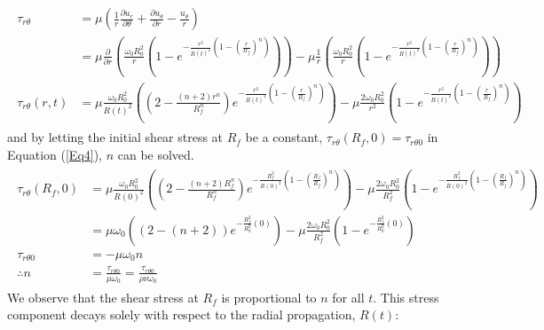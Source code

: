 \documentclass{article}
\begin{document}
\begin{align}\label{Eq4}
    \begin{split}
        \tau_{r \theta} &=  \mu \left (\frac{1}{r} \frac{\partial u_r}{\partial \theta}+  \frac{\partial u_\theta }{\partial r} - \frac{u_\theta}{r}\right ) \\
        &= \mu\frac{\partial}{\partial r}\left(\frac{\omega_{0}R_{0}^{2}}{r}\left(1-e^{-\frac{r^{2}}{R\left(t\right)^{2}}\left(1-\left(\frac{r}{R_{f}}\right)^{n}\right)}\right)\right)-\mu\frac{1}{r}\left(\frac{\omega_{0}R_{0}^{2}}{r}\left(1-e^{-\frac{r^{2}}{R\left(t\right)^{2}}\left(1-\left(\frac{r}{R_{f}}\right)^{n}\right)}\right)\right) \\
        \tau_{r \theta} (r,t)&= \mu\frac{\omega_{0}R_{0}^{2}}{R\left(t\right)^{2}}\left(\left(2-\frac{\left(n+2\right)r^{n}}{R_{f}^{n}}\right)e^{-\frac{r^{2}}{R\left(t\right)^{2}}\left(1-\left(\frac{r}{R_{f}}\right)^{n}\right)}\right)-\mu\frac{2\omega_{0}R_{0}^{2}}{r^{2}}\left(1-e^{-\frac{r^{2}}{R\left(t\right)^{2}}\left(1-\left(\frac{r}{R_{f}}\right)^{n}\right)}\right)
    \end{split}
\end{align}
and by letting the initial shear stress at $R_f$ be a constant, $\tau_{r\theta}(R_f,0)=\tau_{r\theta 0}$ in Equation (\ref{Eq4}), $n$ can be solved.
\begin{align}\label{Eq5}
    \begin{split}
    \tau_{r\theta}(R_f,0) &=\mu\frac{\omega_{0}R_{0}^{2}}{R\left(0\right)^{2}}\left(\left(2-\frac{\left(n+2\right)R_{f}^{n}}{R_{f}^{n}}\right)e^{-\frac{R_{f}^{2}}{R\left(0\right)^{2}}\left(1-\left(\frac{R_{f}}{R_{f}}\right)^{n}\right)}\right)-\mu\frac{2\omega_{0}R_{0}^{2}}{R_{f}^{2}}\left(1-e^{-\frac{R_{f}^{2}}{R\left(0\right)^{2}}\left(1-\left(\frac{R_{f}}{R_{f}}\right)^{n}\right)}\right) \\
    &= \mu\omega_{0}\left(\left(2-\left(n+2\right)\right)e^{-\frac{R_{f}^{2}}{R_{0}^{2}}\left(0\right)}\right)-\mu\frac{2\omega_{0}R_{0}^{2}}{R_{f}^{2}}\left(1-e^{-\frac{R_{f}^{2}}{R_{0}^{2}}\left(0\right)}\right) \\
    \tau_{r\theta 0} &= -\mu\omega_{0}n \\
    \therefore n&= \frac{\tau_{r\theta 0}}{\mu \omega_0} = \frac{\tau_{r\theta 0}}{\rho \nu \omega_0}
    \end{split}
\end{align}
We observe that the shear stress at $R_f$ is proportional to $n$ for all $t$. This stress component decays solely with respect to the radial propagation, $R(t)$:
\end{document}
